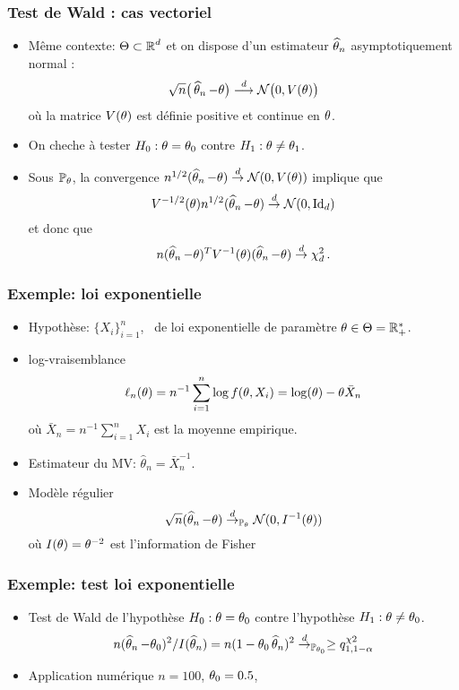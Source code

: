 \begin{frame}
\frametitle{Test de Wald : cas vectoriel}
\begin{itemize}
\item \alert{ Même contexte:} $\Theta \subset \operatorname{{\mathbb R}}^d$ et \alert{on dispose} d'un estimateur $\operatorname{\widehat \theta_{\mathnormal{n}}}$ asymptotiquement normal :
$$\sqrt{n}\big(\operatorname{\widehat \theta_{\mathnormal{n}}}-\theta\big)\stackrel{d}{\longrightarrow} {\mathcal N}\big(0, V(\theta)\big)$$
où la matrice $V(\theta)$ est \alert{définie positive} et continue en $\theta$.
\item On cheche à tester $H_0: \theta= \theta_0$ contre $H_1: \theta \ne \theta_1$.
\item Sous $\operatorname{{\mathbb P}}_\theta$, la convergence $n^{1/2} (\operatorname{\widehat \theta_{\mathnormal{n}}} - \theta) \stackrel{d}{\rightarrow} \mathcal{N}(0,V(\theta))$ implique que
$$
V^{-1/2}(\theta) n^{1/2} (\operatorname{\widehat \theta_{\mathnormal{n}}} - \theta) \stackrel{d}{\rightarrow} \mathcal{N}(0,\mathrm{Id}_{d})
$$
et donc que
$$
n (\operatorname{\widehat \theta_{\mathnormal{n}}} - \theta)^{T} V^{-1}(\theta) (\operatorname{\widehat \theta_{\mathnormal{n}}} - \theta) \stackrel{d}{\rightarrow} \chi^2_d  \,.
$$
\end{itemize}
\end{frame}

\begin{frame}
\frametitle{Exemple: loi exponentielle}
\begin{itemize}
\item \alert{Hypothèse}: $\{X_i\}_{i=1}^n$, \iid\ de loi exponentielle de paramètre $\theta \in \Theta= \mathbb{R}_+^*$.
\item \alert{log-vraisemblance}
\[
\ell_n(\theta)= n^{-1} \sum_{i=1}^n \log f(\theta,X_i)= \log(\theta) - \theta \bar{X}_n
\]
où $\bar{X}_n= n^{-1} \sum_{i=1}^n X_i$ est la moyenne empirique.
\item Estimateur du MV: $\hat{\theta}_n = \bar{X}_n^{-1}$.
\item \alert{Modèle régulier}
\[
\sqrt{n} (\operatorname{\widehat \theta_{\mathnormal{n}}} - \theta) \stackrel{d}{\rightarrow}_{\operatorname{{\mathbb P}}_{\theta}} \mathcal{N}(0,I^{-1}(\theta))
\]
où $I(\theta)= \theta^{-2}$ est l'\alert{information de Fisher}
\end{itemize}
\end{frame}

\begin{frame}
\frametitle{Exemple: test loi exponentielle}
\begin{itemize}
\item \alert{Test de Wald} de l'hypothèse $H_0: \theta = \theta_0$ contre l'hypothèse $H_1: \theta \ne \theta_0$.
\begin{align*}
n (\operatorname{\widehat \theta_{\mathnormal{n}}} - \theta_0)^2/I(\operatorname{\widehat \theta_{\mathnormal{n}}})= n (1 - \theta_0 \operatorname{\widehat \theta_{\mathnormal{n}}})^2 \stackrel{d}{\rightarrow}_{\operatorname{{\mathbb P}}_{\theta_0}} \geq q^{\chi2}_{1,1-\alpha}
\end{align*}
\item \alert{Application numérique} $n=100$, $\theta_0=0.5$,
\end{itemize}
\end{frame}


